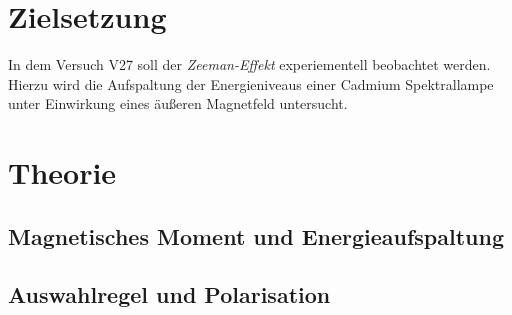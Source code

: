 \setcounter{page}{1}
\section*{Zielsetzung}
In dem Versuch V27 soll der \emph{Zeeman-Effekt} experiementell beobachtet werden.
Hierzu wird die Aufspaltung der Energieniveaus einer Cadmium Spektrallampe
unter Einwirkung eines äußeren Magnetfeld untersucht.

\section{Theorie}

\subsection{Magnetisches Moment und Energieaufspaltung}

\subsection{Auswahlregel und Polarisation}
